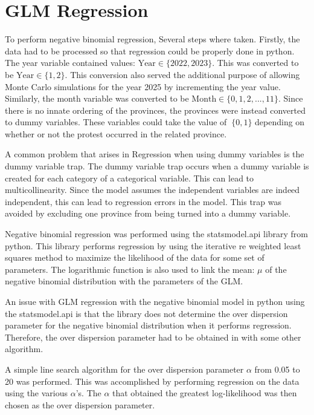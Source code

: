 \documentclass{article}
\begin{document}
\section{GLM Regression}
    To perform negative binomial regression, Several steps where taken. Firstly, the data had to be  processed so that regression could be properly done in python. The year variable contained values: \( \text{Year} \in \{2022, 2023\} \). This was converted to be \( \text{Year} \in \{1, 2\} \). This conversion also served the additional purpose of allowing Monte Carlo simulations for the year 2025 by incrementing the year value. Similarly, the month variable was converted to be \( \text{Month} \in \{0,1,2,...,11\} \). Since there is no innate ordering of the provinces, the provinces were instead converted to dummy variables. These variables could take the value of \( \ \{0,1\} \) depending on whether or not the protest occurred in the related province.

    A common problem that arises in Regression when using dummy variables is the dummy variable trap. The dummy variable trap occurs when a dummy variable is created for each category of a categorical variable. This can lead to multicollinearity. Since the model assumes the independent variables are indeed independent, this can lead to regression errors in the model. This trap was avoided by excluding one province from being turned into a dummy variable.

    Negative binomial regression was performed using the statsmodel.api library from python. This library performs regression by using the iterative re weighted least squares method to maximize the likelihood of the data for some set of parameters. The logarithmic function is also used to link the mean: \(\mu\) of the negative binomial distribution with the parameters of the GLM.

    An issue with GLM regression with the negative binomial model in python using the statsmodel.api is that the library does not determine the over dispersion parameter for the negative binomial distribution when it performs regression. Therefore, the over dispersion parameter had to be obtained in with some other algorithm. 

    A simple line search algorithm for the over dispersion parameter \(\alpha\)   from 0.05 to 20 was performed. This was accomplished by performing regression on the data using the various \(\alpha\)'s. The \(\alpha\) that obtained the greatest log-likelihood was then chosen as the over dispersion parameter.
\end{document}
